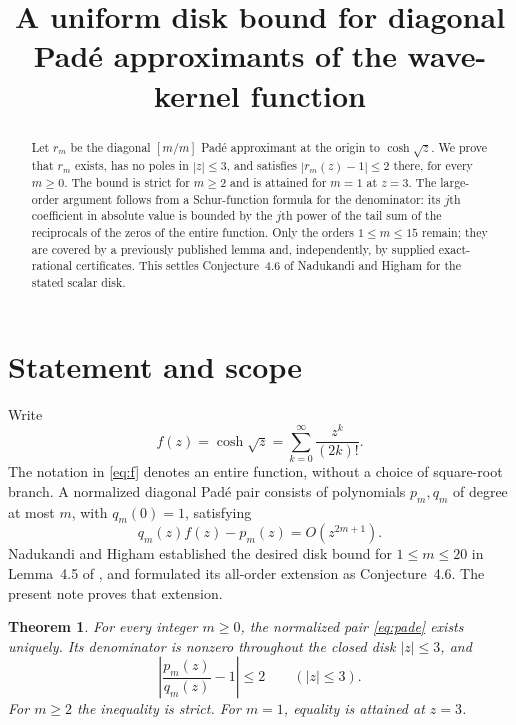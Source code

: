 \documentclass[11pt]{article}
\title{A uniform disk bound for diagonal Pad\'e approximants of the wave-kernel function}
\author{}
\date{}
\newtheorem{theorem}{Theorem}
\theoremstyle{remark}\newtheorem{remark}[theorem]{Remark}
\begin{document}
\maketitle
\begin{abstract}
Let $r_m$ be the diagonal $[m/m]$ Pad\'e approximant at the origin to $\cosh\sqrt z$. We prove that $r_m$ exists, has no poles in $|z|\leq3$, and satisfies $|r_m(z)-1|\leq2$ there, for every $m\geq0$. The bound is strict for $m\geq2$ and is attained for $m=1$ at $z=3$. The large-order argument follows from a Schur-function formula for the denominator: its $j$th coefficient in absolute value is bounded by the $j$th power of the tail sum of the reciprocals of the zeros of the entire function. Only the orders $1\leq m\leq15$ remain; they are covered by a previously published lemma and, independently, by supplied exact-rational certificates. This settles Conjecture~4.6 of Nadukandi and Higham for the stated scalar disk.
\end{abstract}

\section{Statement and scope}
Write
\begin{equation}\label{eq:f}
f(z)=\cosh\sqrt z=\sum_{k=0}^{\infty}\frac{z^k}{(2k)!}.
\end{equation}
The notation in \eqref{eq:f} denotes an entire function, without a choice of square-root branch. A normalized diagonal Pad\'e pair consists of polynomials $p_m,q_m$ of degree at most $m$, with $q_m(0)=1$, satisfying
\begin{equation}\label{eq:pade}
q_m(z)f(z)-p_m(z)=O(z^{2m+1}).
\end{equation}
Nadukandi and Higham established the desired disk bound for $1\leq m\leq20$ in Lemma~4.5 of \cite{NH}, and formulated its all-order extension as Conjecture~4.6. The present note proves that extension.

\begin{theorem}\label{thm:main}
For every integer $m\geq0$, the normalized pair \eqref{eq:pade} exists uniquely. Its denominator is nonzero throughout the closed disk $|z|\leq3$, and
\begin{equation}\label{eq:main}
\left|\frac{p_m(z)}{q_m(z)}-1\right|\leq2\qquad(|z|\leq3).
\end{equation}
For $m\geq2$ the inequality is strict. For $m=1$, equality is attained at $z=3$.
\end{theorem}
\end{document}

